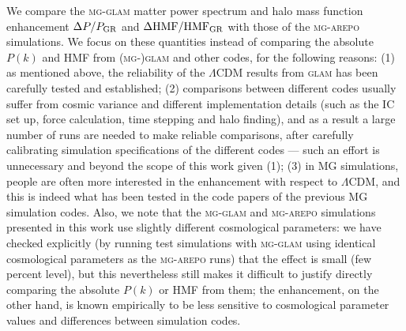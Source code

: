 We compare the \textsc{mg-glam} matter power spectrum and halo mass function enhancement $\Delta P / P_{\rm GR}$ and $\Delta \mathrm{HMF} / \mathrm{HMF}_{\rm GR}$ with those of the \textsc{mg-arepo} simulations.
We focus on these quantities instead of comparing the absolute $P(k)$ and HMF from (\textsc{mg}-)\textsc{glam} and other codes, for the following reasons: (1) as mentioned above, the reliability of the $\Lambda$CDM results from \textsc{glam} has been carefully tested and established; (2) comparisons between different codes usually suffer from cosmic variance and different implementation details (such as the IC set up, force calculation, time stepping and halo finding), and as a result a large number of runs are needed to make reliable comparisons, after carefully calibrating simulation specifications of the different codes --- such an effort is unnecessary and beyond the scope of this work given (1); (3) in MG simulations, people are often more interested in the enhancement with respect to $\Lambda$CDM, and this is indeed what has been tested in the code papers of the previous MG simulation codes. Also, we note that the \textsc{mg-glam} and \textsc{mg-arepo} simulations presented in this work use slightly different cosmological parameters: we have checked explicitly (by running test simulations with \textsc{mg-glam} using identical cosmological parameters as the \textsc{mg-arepo} runs) that the effect is small (few percent level), but this nevertheless still makes it difficult to justify directly comparing the absolute $P(k)$ or HMF from them; the enhancement, on the other hand, is known empirically to be less sensitive to cosmological parameter values and differences between simulation codes.



